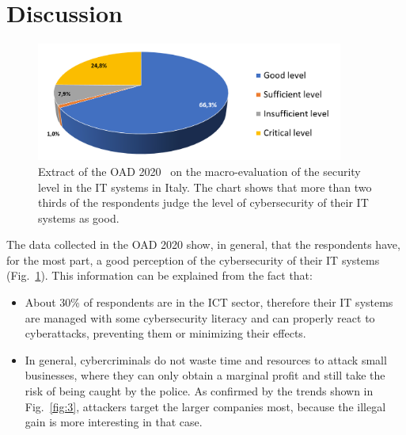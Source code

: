 \documentclass{easychair}
\begin{document}
\section{Discussion}\label{sec:DataDiscussion}

\begin{figure}
	\centering
		\includegraphics[width=0.9\textwidth]{pictures/fig1.png}
		\caption{Extract of the OAD 2020~\cite{oad20} on the macro-evaluation
                  of the security level in the IT systems in Italy.
                  The chart shows that more than two thirds of the respondents
                  judge the level of cybersecurity of their IT systems as good.}
		\label{fig:1}
\end{figure}

The data collected in the OAD 2020 show, in general, that the respondents have, for the most part,
a good perception of the cybersecurity of their IT systems (Fig.~\ref{fig:1}).
This information can be explained from the fact that:
 
\begin{itemize}
\item About 30\% of respondents are in the ICT sector, therefore their IT systems
  are managed with some cybersecurity literacy and can properly react to cyberattacks, preventing 
  them or minimizing their effects.

\item In general, cybercriminals do not waste time and resources to attack small businesses,
  where they can only obtain a marginal profit and still
  take the risk of being caught by the police.  As confirmed by the trends shown
  in Fig.~\ref{fig:3}, attackers target the larger companies most,
  because the illegal gain is more interesting in that case.
\end{itemize}
\end{document}
